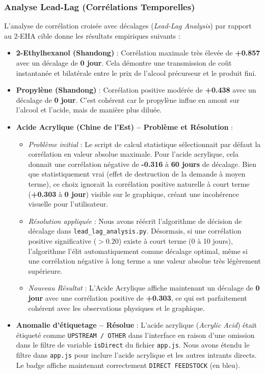 \documentclass[12pt,a4paper]{article}
\begin{document}
\subsubsection{Analyse Lead-Lag (Corrélations Temporelles)}
L'analyse de corrélation croisée avec décalages (\textit{Lead-Lag Analysis}) par rapport au 2-EHA cible donne les résultats empiriques suivants :
\begin{itemize}
    \item \textbf{2-Ethylhexanol (Shandong)} : Corrélation maximale très élevée de \textbf{+0.857} avec un décalage de \textbf{0 jour}. Cela démontre une transmission de coût instantanée et bilatérale entre le prix de l'alcool précurseur et le produit fini.
    \item \textbf{Propylène (Shandong)} : Corrélation positive modérée de \textbf{+0.438} avec un décalage de \textbf{0 jour}. C'est cohérent car le propylène influe en amont sur l'alcool et l'acide, mais de manière plus diluée.
    \item \textbf{Acide Acrylique (Chine de l'Est) -- Problème et Résolution} : 
    \begin{itemize}
        \item \textit{Problème initial} : Le script de calcul statistique sélectionnait par défaut la corrélation en valeur absolue maximale. Pour l'acide acrylique, cela donnait une corrélation négative de \textbf{-0.316} à \textbf{60 jours} de décalage. Bien que statistiquement vrai (effet de destruction de la demande à moyen terme), ce choix ignorait la corrélation positive naturelle à court terme (\textbf{+0.303} à \textbf{0 jour}) visible sur le graphique, créant une incohérence visuelle pour l'utilisateur.
        \item \textit{Résolution appliquée} : Nous avons réécrit l'algorithme de décision de décalage dans \texttt{lead\_lag\_analysis.py}. Désormais, si une corrélation positive significative ($> 0.20$) existe à court terme (0 à 10 jours), l'algorithme l'élit automatiquement comme décalage optimal, même si une corrélation négative à long terme a une valeur absolue très légèrement supérieure.
        \item \textit{Nouveau Résultat} : L'Acide Acrylique affiche maintenant un décalage de \textbf{0 jour} avec une corrélation positive de \textbf{+0.303}, ce qui est parfaitement cohérent avec les observations physiques et le graphique.
    \end{itemize}
    \item \textbf{Anomalie d'étiquetage -- Résolue} : L'acide acrylique (\textit{Acrylic Acid}) était étiqueté comme \texttt{UPSTREAM / OTHER} dans l'interface en raison d'une omission dans le filtre de variable \texttt{isDirect} du fichier \texttt{app.js}. Nous avons étendu le filtre dans \texttt{app.js} pour inclure l'acide acrylique et les autres intrants directs. Le badge affiche maintenant correctement \texttt{DIRECT FEEDSTOCK} (en bleu).
\end{itemize}
\end{document}
